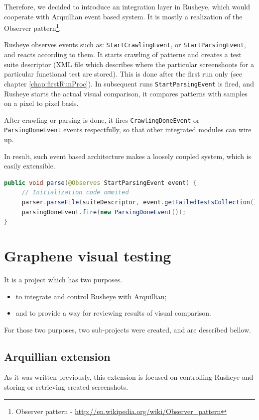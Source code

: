 \documentclass[11pt,oneside,final]{fithesis2}
\begin{document}
Therefore, we decided to introduce an integration layer in Rusheye, which would cooperate with Arquillian event based system.
It is mostly a realization of the Observer pattern\footnote{Observer pattern - \url{http://en.wikipedia.org/wiki/Observer_pattern}}.

Rusheye observes events such as: \texttt{StartCrawlingEvent}, or \texttt{StartParsingEvent}, and reacts according to them. It starts
crawling of patterns and creates a test suite descriptor (XML file which describes where the particular screenshoots for a particular
functional test are stored). This is done after the first run only (see chapter \ref{chap:firstRunProc}). In subsequent runs \texttt{StartParsingEvent}
is fired, and Rusheye starts the actual visual comparison, it compares patterns with samples on a pixel to pixel basis.

After crawling or parsing is done, it fires \texttt{CrawlingDoneEvent} or \texttt{ParsingDoneEvent} events respectfully, so that other integrated
modules can wire up.

In result, such event based architecture makes a loosely coupled system, which is easily extensible.

\begin{lstlisting}[caption=Example of StartParsingEvent observer,label=lis:startParsingObserver,language=java, breaklines=true]
public void parse(@Observes StartParsingEvent event) {
     // Initialization code ommited
     parser.parseFile(suiteDescriptor, event.getFailedTestsCollection());
     parsingDoneEvent.fire(new ParsingDoneEvent());
}
\end{lstlisting}
  
\section{Graphene visual testing}
    It is a project which has two purposes.
    \begin{itemize}
     \item to integrate and control Rusheye with Arquillian;
     \item and to provide a way for reviewing results of visual comparison.
    \end{itemize}

    For those two purposes, two sub-projects were created, and are described bellow.
    
    \subsection{Arquillian extension}
    \label{sec:arqExt}
    As it was written previously, this extension is focused on controlling Rusheye and storing or retrieving created screenshots.
    
\end{document}
